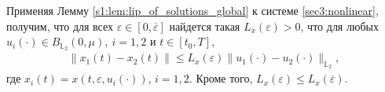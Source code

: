 \documentclass[../main.tex]{subfiles}
\begin{document}
Применяя Лемму \ref{s1:lem:lip_of_solutions_global} к системе \eqref{sec3:nonlinear}, получим, что для всех $\varepsilon\in [0,\overline{\varepsilon}]$ найдется такая $L_x(\varepsilon) > 0$, что для любых $u_i(\cdot) \in B_{\mathbb{L}_2}(0,\mu), \ i = 1,2$ и $t \in [t_0,T]$, 
\begin{gather*}
	\| x_1(t) - x_2(t) \| \leqslant L_x(\varepsilon) \| u_1(\cdot) - u_2(\cdot) \|_{\mathbb{L}_2},
\end{gather*}
где $x_i(t) = x(t,\varepsilon,u_i(\cdot))$, $i = 1,2$. 
Кроме того, $L_x(\varepsilon) \leqslant L_x(\overline{\varepsilon})$. 
\end{document}

